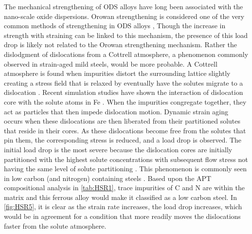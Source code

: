 		The mechanical strengthening of ODS alloys have long been associated with the nano-scale oxide dispersions. Orowan strengthening is considered one of the very common methods of strengthening in ODS alloys \cite{RN263}, Though the increase in strength with straining can be linked to this mechanism, the presence of this load drop is likely not related to the Orowan strengthening mechanism. Rather the dislodgment of dislocations from a Cottrell atmosphere, a phenomenon commonly observed in strain-aged mild steels, would be more probable. A Cottrell atmosphere is found when impurities distort the surrounding lattice slightly creating a stress field that is relaxed by eventually have the solutes migrate to a dislocation \cite{RN963}. Recent simulation studies have shown the interaction of dislocation core with the solute atoms in Fe \cite{RN1132,RN1370}. When the impurities congregate together, they act as particles that then impede dislocation motion. Dynamic strain aging occurs when these dislocations are then liberated from their partitioned solutes that reside in their cores. As these dislocations become free from the solutes that pin them, the corresponding stress is reduced, and a load drop is observed. The initial load drop is the most severe because the dislocation cores are initially partitioned with the highest solute concentrations with subsequent flow stress not having the same level of solute partitioning \cite{RN962,RN705}. This phenomenon is commonly seen in low carbon (and nitrogen) containing steels \cite{RN241}. Based upon the APT compositional analysis in \ref{tab:HSR1}, trace impurities of C and N are within the matrix and this ferrous alloy would make it classified as a low carbon steel. In \ref{fig:HSR5}, it is clear as the strain rate increases, the load drop increases, which would be in agreement for a condition that more readily moves the dislocations faster from the solute atmosphere.
		
